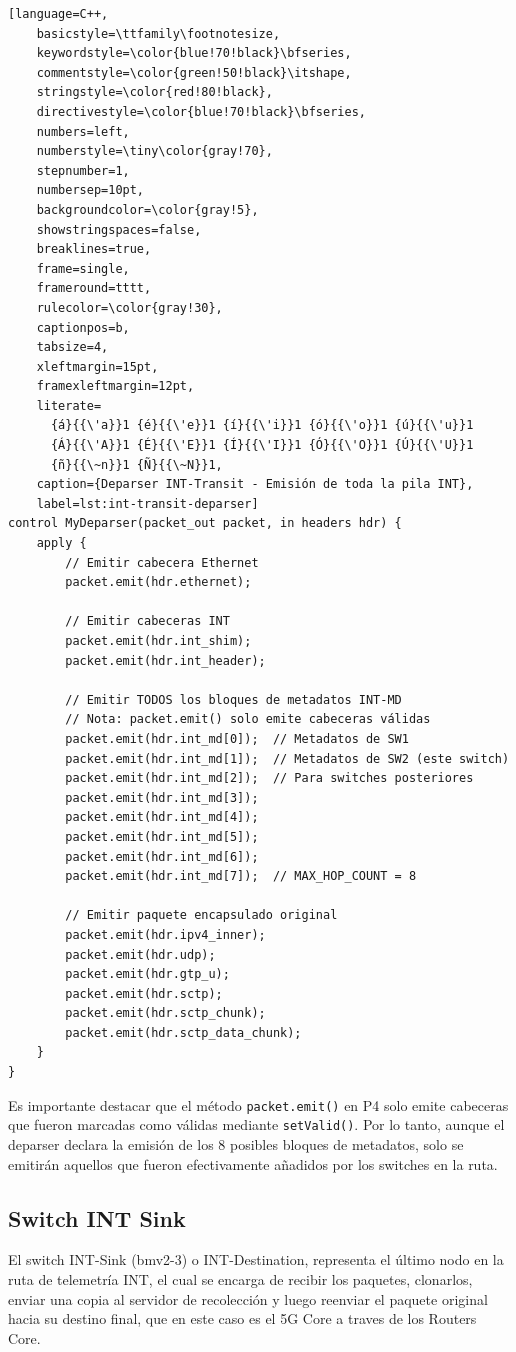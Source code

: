 \begin{lstlisting}[language=C++,
    basicstyle=\ttfamily\footnotesize,
    keywordstyle=\color{blue!70!black}\bfseries,
    commentstyle=\color{green!50!black}\itshape,
    stringstyle=\color{red!80!black},
    directivestyle=\color{blue!70!black}\bfseries,
    numbers=left,
    numberstyle=\tiny\color{gray!70},
    stepnumber=1,
    numbersep=10pt,
    backgroundcolor=\color{gray!5},
    showstringspaces=false,
    breaklines=true,
    frame=single,
    frameround=tttt,
    rulecolor=\color{gray!30},
    captionpos=b,
    tabsize=4,
    xleftmargin=15pt,
    framexleftmargin=12pt,
    literate=
      {á}{{\'a}}1 {é}{{\'e}}1 {í}{{\'i}}1 {ó}{{\'o}}1 {ú}{{\'u}}1
      {Á}{{\'A}}1 {É}{{\'E}}1 {Í}{{\'I}}1 {Ó}{{\'O}}1 {Ú}{{\'U}}1
      {ñ}{{\~n}}1 {Ñ}{{\~N}}1,
    caption={Deparser INT-Transit - Emisión de toda la pila INT}, 
    label=lst:int-transit-deparser]
control MyDeparser(packet_out packet, in headers hdr) {
    apply {
        // Emitir cabecera Ethernet
        packet.emit(hdr.ethernet);
        
        // Emitir cabeceras INT
        packet.emit(hdr.int_shim);
        packet.emit(hdr.int_header);

        // Emitir TODOS los bloques de metadatos INT-MD
        // Nota: packet.emit() solo emite cabeceras válidas
        packet.emit(hdr.int_md[0]);  // Metadatos de SW1
        packet.emit(hdr.int_md[1]);  // Metadatos de SW2 (este switch)
        packet.emit(hdr.int_md[2]);  // Para switches posteriores
        packet.emit(hdr.int_md[3]);
        packet.emit(hdr.int_md[4]);
        packet.emit(hdr.int_md[5]);
        packet.emit(hdr.int_md[6]);
        packet.emit(hdr.int_md[7]);  // MAX_HOP_COUNT = 8

        // Emitir paquete encapsulado original
        packet.emit(hdr.ipv4_inner);
        packet.emit(hdr.udp);
        packet.emit(hdr.gtp_u);
        packet.emit(hdr.sctp);
        packet.emit(hdr.sctp_chunk);
        packet.emit(hdr.sctp_data_chunk);
    }
}
\end{lstlisting}

Es importante destacar que el método \texttt{packet.emit()} en P4 solo emite cabeceras que fueron marcadas como válidas mediante \texttt{setValid()}. Por lo tanto, aunque el deparser declara la emisión de los 8 posibles bloques de metadatos, solo se emitirán aquellos que fueron efectivamente añadidos por los switches en la ruta.
\subsection{Switch INT Sink}
El switch INT-Sink (bmv2-3) o INT-Destination, representa el último nodo en la ruta de telemetría INT, el cual se encarga de recibir los paquetes, clonarlos, enviar una copia al servidor de recolección y luego reenviar el paquete original hacia su destino final, que en este caso es el 5G Core a traves de los Routers Core.

